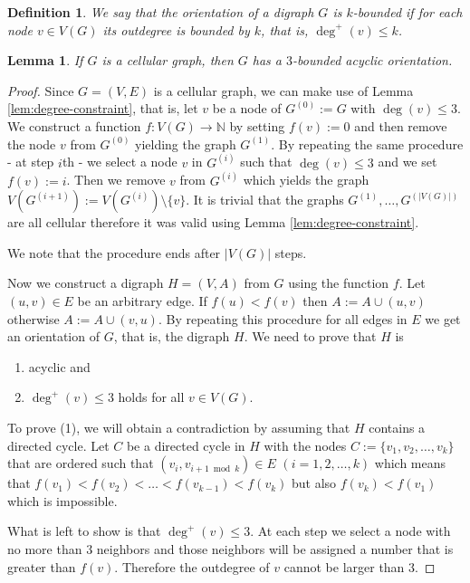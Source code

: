 \documentclass[letterpaper, 10 pt, conference]{ieeeconf}  %
\newtheorem{lem}{Lemma}
\newtheorem{defi}{Definition}
\begin{document}
\begin{defi}
We say that the orientation of a digraph $G$ is $k$\textit{-bounded} if for each node $v \in V(G)$ its outdegree is bounded by $k$, that is, $\deg^+(v) \leqslant k$.
\end{defi}
\begin{lem}\label{lem:bounded-acyclic-orientation}
If $G$ is a cellular graph, then $G$ has a $3$-bounded acyclic orientation.
\end{lem}
\begin{proof} Since $G=(V,E)$ is a cellular graph, we can make use of Lemma \ref{lem:degree-constraint}, that is, let $v$ be a node of $G^{(0)}:=G$ with $\deg(v) \leqslant 3$. We construct a function $f\colon V(G) \to \mathbb{N}$ by setting $f(v) := 0$ and then remove the node $v$ from $G^{(0)}$ yielding the graph $G^{(1)}$. By repeating the same procedure - at step $i$th - we select a node $v$ in $G^{(i)}$ such that $\deg(v) \leqslant 3$ and we set $f(v):=i$. Then we remove $v$ from $G^{(i)}$ which yields the graph $V(G^{(i+1)}) := V(G^{(i)}) \setminus \lbrace v \rbrace$. It is trivial that the graphs $G^{(1)},\ldots,G^{(|V(G)|)}$ are all cellular therefore it was valid using Lemma \ref{lem:degree-constraint}.

We note that the procedure ends after $|V(G)|$ steps.

Now we construct a digraph $H=(V,A)$ from $G$ using the function $f$. Let $(u,v) \in E$ be an arbitrary edge. If $f(u) < f(v)$ then $A:=A\cup (u,v)$ otherwise $A:=A \cup (v,u)$. By repeating this procedure for all edges in $E$ we get an orientation of $G$, that is, the digraph $H$. We need to prove that $H$ is
\begin{enumerate}
\item acyclic and
\item $\deg^+(v) \leqslant 3$ holds for all $v \in V(G)$.
\end{enumerate}
To prove (1), we will obtain a contradiction by assuming that $H$ contains a directed cycle. Let $C$ be a directed cycle in $H$ with the nodes $C:=\lbrace v_1,v_2,\ldots,v_k \rbrace$ that are ordered such that $(v_i,v_{i+1 \bmod{k}}) \in E$ $(i=1,2,\ldots,k)$ which means that $f(v_1) < f(v_2) < \ldots < f(v_{k-1}) < f(v_k)$ but also $f(v_k) < f(v_1)$ which is impossible.

What is left to show is that $\deg^+(v) \leqslant 3$. At each step we select a node with no more than $3$ neighbors and those neighbors will be assigned a number that is greater than $f(v)$. Therefore the outdegree of $v$ cannot be larger than $3$.
\end{proof}
\end{document}
